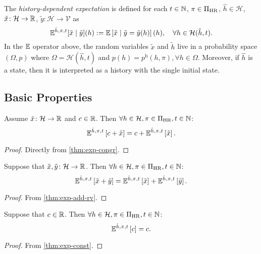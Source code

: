\begin{definition}\label{def:expect-h-cnd-rv}
The \emph{history-dependent expectation} is defined for each $t\in \mathbb{N}$, $\pi\in \Pi_{\mathrm{HR}}$, $\hat{h}\in \mathcal{H}$, $\tilde{x}\colon \mathcal{H} \to \mathbb{R}$, $\tilde{y}\colon \mathcal{H} \to \mathcal{\mathcal{V}}$ as
\begin{equation*}
\mathbb{E}^{\hat{h}, \pi, t} [\tilde{x} \mid \tilde{y} ](h)
:= \mathbb{E} \left[ \tilde{x} \mid \tilde{y} = \tilde{y}(h) \right](h), \quad\forall h\in \mathcal{H}(\hat{h}, t).
\end{equation*}
In the $\mathbb{E}$ operator above, the random variables $\tilde{x}$ and $\tilde{h}$ live in a probability space $(\Omega, p)$ where $\Omega = \mathcal{H}(\hat{h}, t)$ and $p(h) = p^{\mathrm{h}}(h, \pi), \forall h\in \Omega$.
Moreover, if $\hat{h}$ is a state, then it is interpreted as a history with the single initial state.
 \leanok
\end{definition}


\subsection{Basic Properties}


\begin{theorem} \label{thm:exph-congr}
Assume $\tilde{x} \colon \mathcal{H} \to \mathbb{R}$ and $c \in \mathbb{R}$. Then $\forall h\in \mathcal{H}, \pi\in \Pi_{\mathrm{HR}}, t \in \mathbb{N}$:
\[
  \mathbb{E}^{\hat{h}, \pi, t} \left[ c + \tilde{x} \right]
  =
  c + \mathbb{E}^{\hat{h}, \pi, t} \left[ \tilde{x} \right].
\]
 \leanok
\end{theorem}
\begin{proof}
Directly from \cref{thm:exp-congr}. 
\end{proof}

\begin{theorem} \label{thm:exph-add-rv}
Suppose that $\tilde{x}, \tilde{y} \colon \mathcal{H} \to \mathbb{R} $. Then $\forall h\in \mathcal{H}, \pi\in \Pi_{\mathrm{HR}}, t \in \mathbb{N}$:
\[
  \mathbb{E}^{\hat{h}, \pi, t} \left[ \tilde{x} + \tilde{y} \right]
  =
  \mathbb{E}^{\hat{h}, \pi, t} \left[ \tilde{x} \right] + \mathbb{E}^{\hat{h}, \pi, t} \left[ \tilde{y} \right].
\]
\end{theorem}
\begin{proof}
  From \cref{thm:exp-add-rv}.
\end{proof}

\begin{theorem} \label{thm:exph-const}
Suppose that $c\in \mathbb{R}$. Then $\forall h\in \mathcal{H}, \pi\in \Pi_{\mathrm{HR}}, t \in \mathbb{N}$:
\[
  \mathbb{E}^{\hat{h}, \pi, t} \left[ c \right] = c.
\]
\end{theorem}
\begin{proof}
  From \cref{thm:exp-const}.
\end{proof}

